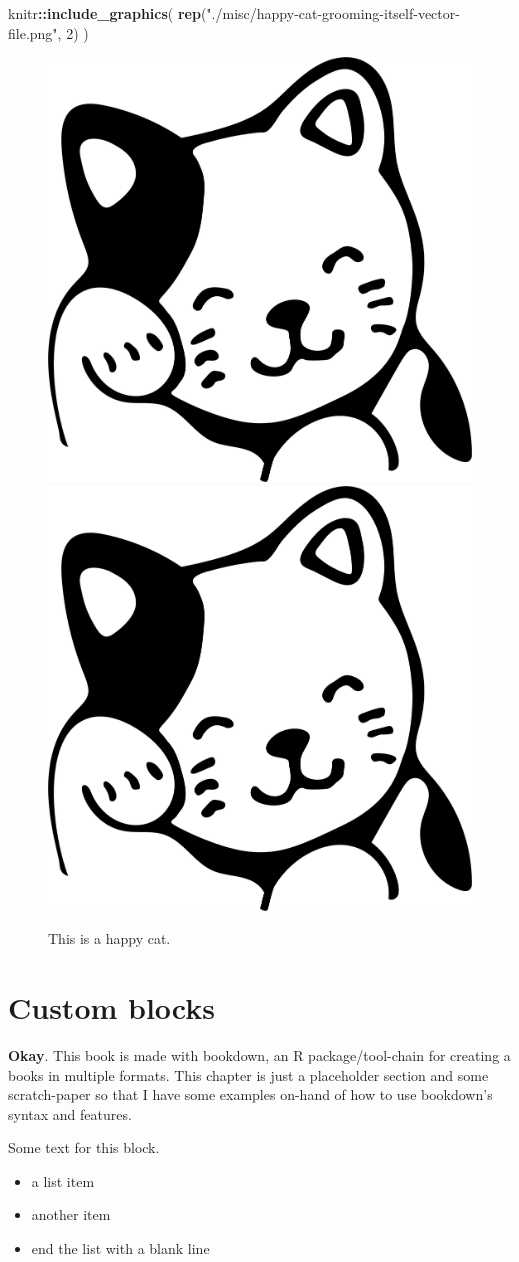 \documentclass [11pt, proquest] {uwthesis}[2015/03/03]
\providecommand{\tightlist}{%
  \setlength{\itemsep}{0pt}\setlength{\parskip}{0pt}}
\let\Begin\begin
\let\End\end
\newenvironment{Shaded}{}{}
\newcommand{\KeywordTok}[1]{\textcolor[rgb]{0.00,0.44,0.13}{\textbf{{#1}}}}
\newcommand{\DecValTok}[1]{\textcolor[rgb]{0.25,0.63,0.44}{{#1}}}
\newcommand{\StringTok}[1]{\textcolor[rgb]{0.25,0.44,0.63}{{#1}}}
\newcommand{\NormalTok}[1]{{#1}}
\newcommand{\OperatorTok}[1]{\textcolor[rgb]{0.00,0.44,0.13}{\textbf{{#1}}}}
\begin{document}
\begin{Shaded}
\begin{Highlighting}[]
\NormalTok{knitr}\OperatorTok{::}\KeywordTok{include_graphics}\NormalTok{(}
  \KeywordTok{rep}\NormalTok{(}\StringTok{"./misc/happy-cat-grooming-itself-vector-file.png"}\NormalTok{, }\DecValTok{2}\NormalTok{)}
\NormalTok{)}
\end{Highlighting}
\end{Shaded}
\begin{figure}
\includegraphics[width=0.3\linewidth]{./misc/happy-cat-grooming-itself-vector-file} \includegraphics[width=0.3\linewidth]{./misc/happy-cat-grooming-itself-vector-file} \caption{This is a happy cat.}\label{fig:happy-cat}
\end{figure}
\section{Custom blocks}\label{custom-blocks}

\Begin{infobox}

\textbf{Okay}. This book is made with bookdown, an R package/tool-chain
for creating a books in multiple formats. This chapter is just a
placeholder section and some scratch-paper so that I have some examples
on-hand of how to use bookdown's syntax and features.

Some text for this block.
\begin{itemize}
\tightlist
\item
  a list item
\item
  another item
\item
  end the list with a blank line
\end{itemize}
\End{infobox}
\end{document}
